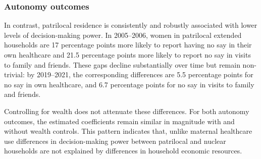 \documentclass[10pt,twoside,reqno]{article}
\begin{document}
\subsubsection{Autonomy outcomes}

In contrast, patrilocal residence is consistently and robustly associated with lower levels of decision-making power. In 2005–2006, women in patrilocal extended households are 17 percentage points more likely to report having no say in their own healthcare and 21.5 percentage points more likely to report no say in visits to family and friends. These gaps decline substantially over time but remain non-trivial: by 2019–2021, the corresponding differences are 5.5 percentage points for no say in own healthcare, and 6.7 percentage points for no say in visits to family and friends. 

Controlling for wealth does not attenuate these differences. For both autonomy outcomes, the estimated coefficients remain similar in magnitude with and without wealth controls. This pattern indicates that, unlike maternal healthcare use differences in decision-making power between patrilocal and nuclear households are not explained by differences in household economic resources.
\end{document}
